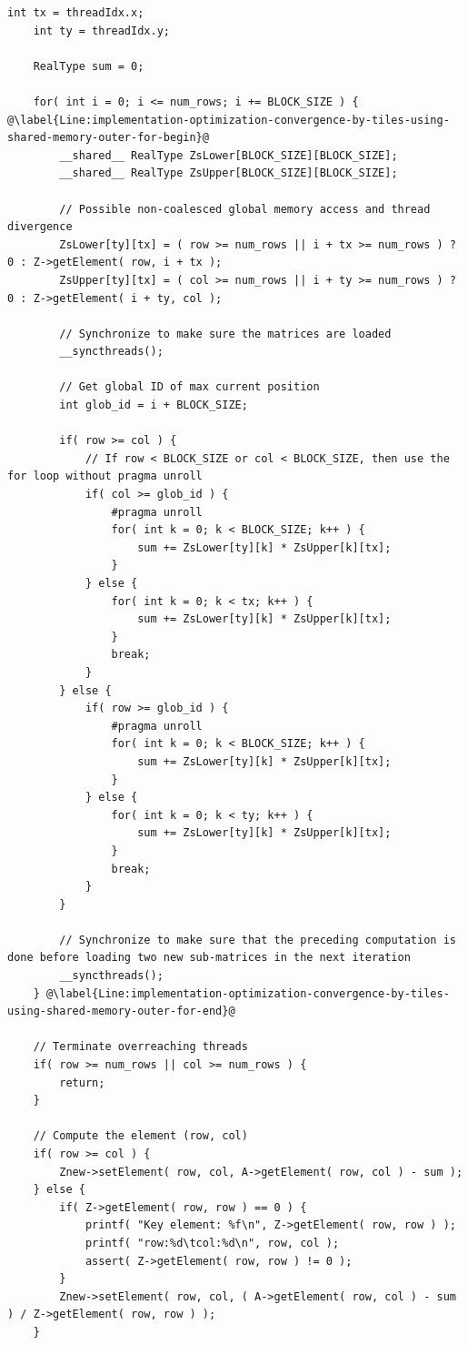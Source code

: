 \begin{lstlisting}[caption={Calculation of a single iteration of the GPU Iterative Crout method using logic from Listing~\ref{Listing:CUDA-matrix-multiplication-with-shared-memory-example}. Taken from the Decomposition project repository on GitLab\protect\footref{Footnote:decomposition-project-gitlab-url}.},label={Listing:implementation-optimization-convergence-by-tiles-using-shared-memory},escapechar=@]
	int tx = threadIdx.x;
	int ty = threadIdx.y;
	
	RealType sum = 0;
	
	for( int i = 0; i <= num_rows; i += BLOCK_SIZE ) { @\label{Line:implementation-optimization-convergence-by-tiles-using-shared-memory-outer-for-begin}@
		__shared__ RealType ZsLower[BLOCK_SIZE][BLOCK_SIZE];
		__shared__ RealType ZsUpper[BLOCK_SIZE][BLOCK_SIZE];
		
		// Possible non-coalesced global memory access and thread divergence
		ZsLower[ty][tx] = ( row >= num_rows || i + tx >= num_rows ) ? 0 : Z->getElement( row, i + tx );
		ZsUpper[ty][tx] = ( col >= num_rows || i + ty >= num_rows ) ? 0 : Z->getElement( i + ty, col );
		
		// Synchronize to make sure the matrices are loaded
		__syncthreads();
		
		// Get global ID of max current position
		int glob_id = i + BLOCK_SIZE;
		
		if( row >= col ) {
			// If row < BLOCK_SIZE or col < BLOCK_SIZE, then use the for loop without pragma unroll
			if( col >= glob_id ) {
				#pragma unroll
				for( int k = 0; k < BLOCK_SIZE; k++ ) {
					sum += ZsLower[ty][k] * ZsUpper[k][tx];
				}
			} else {
				for( int k = 0; k < tx; k++ ) {
					sum += ZsLower[ty][k] * ZsUpper[k][tx];
				}
				break;
			}
		} else {
			if( row >= glob_id ) {
				#pragma unroll
				for( int k = 0; k < BLOCK_SIZE; k++ ) {
					sum += ZsLower[ty][k] * ZsUpper[k][tx];
				}
			} else {
				for( int k = 0; k < ty; k++ ) {
					sum += ZsLower[ty][k] * ZsUpper[k][tx];
				}
				break;
			}
		}
		
		// Synchronize to make sure that the preceding computation is done before loading two new sub-matrices in the next iteration
		__syncthreads();
	} @\label{Line:implementation-optimization-convergence-by-tiles-using-shared-memory-outer-for-end}@

	// Terminate overreaching threads
	if( row >= num_rows || col >= num_rows ) {
		return;
	}
	
	// Compute the element (row, col)
	if( row >= col ) {
		Znew->setElement( row, col, A->getElement( row, col ) - sum );
	} else {
		if( Z->getElement( row, row ) == 0 ) {
			printf( "Key element: %f\n", Z->getElement( row, row ) );
			printf( "row:%d\tcol:%d\n", row, col );
			assert( Z->getElement( row, row ) != 0 );
		}
		Znew->setElement( row, col, ( A->getElement( row, col ) - sum ) / Z->getElement( row, row ) );
	}
\end{lstlisting}

